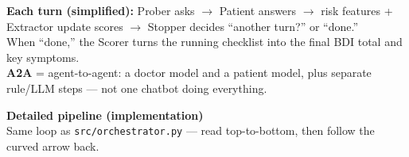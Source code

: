 \documentclass[11pt]{article}
\begin{document}
\vspace{0.5em}
{\small\sffamily
\textbf{Each turn (simplified):} Prober asks $\rightarrow$ Patient answers $\rightarrow$ risk features + Extractor update scores $\rightarrow$ Stopper decides ``another turn?'' or ``done.''\\
When ``done,'' the Scorer turns the running checklist into the final BDI total and key symptoms.\\
\textbf{A2A} = agent-to-agent: a doctor model and a patient model, plus separate rule/LLM steps — not one chatbot doing everything.}

\newpage

{\large\bfseries\sffamily Detailed pipeline (implementation)}\\[0.5em]
{\small\sffamily Same loop as \texttt{src/orchestrator.py} — read top-to-bottom, then follow the curved arrow back.}

\vspace{0.5em}
\end{document}
